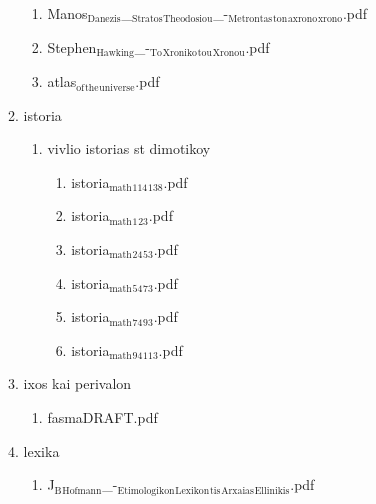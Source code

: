 \documentclass[11pt]{article}
\begin{document}
\begin{enumerate}
\begin{enumerate}
\begin{enumerate}
\item Manos$_{\text{Danezis}}$\_$_{\text{Stratos}}$$_{\text{Theodosiou}}$\_-$_{\text{Metrontas}}$$_{\text{ton}}$$_{\text{axrono}}$$_{\text{xrono}}$.pdf
\label{sec-1-1-1-1-49-2-2-1-67-2}

\item Stephen$_{\text{Hawking}}$\_-$_{\text{To}}$$_{\text{Xroniko}}$$_{\text{tou}}$$_{\text{Xronou}}$.pdf
\label{sec-1-1-1-1-49-2-2-1-67-3}

\item atlas$_{\text{of}}$$_{\text{the}}$$_{\text{universe}}$.pdf
\label{sec-1-1-1-1-49-2-2-1-67-4}
\end{enumerate}

\item istoria
\label{sec-1-1-1-1-49-2-2-1-68}
\begin{enumerate}
\item vivlio istorias st dimotikoy
\label{sec-1-1-1-1-49-2-2-1-68-1}
\begin{enumerate}
\item istoria$_{\text{math}}$$_{\text{114}}$$_{\text{138}}$.pdf
\label{sec-1-1-1-1-49-2-2-1-68-1-1}

\item istoria$_{\text{math}}$$_{\text{1}}$$_{\text{23}}$.pdf
\label{sec-1-1-1-1-49-2-2-1-68-1-2}

\item istoria$_{\text{math}}$$_{\text{24}}$$_{\text{53}}$.pdf
\label{sec-1-1-1-1-49-2-2-1-68-1-3}

\item istoria$_{\text{math}}$$_{\text{54}}$$_{\text{73}}$.pdf
\label{sec-1-1-1-1-49-2-2-1-68-1-4}

\item istoria$_{\text{math}}$$_{\text{74}}$$_{\text{93}}$.pdf
\label{sec-1-1-1-1-49-2-2-1-68-1-5}

\item istoria$_{\text{math}}$$_{\text{94}}$$_{\text{113}}$.pdf
\label{sec-1-1-1-1-49-2-2-1-68-1-6}
\end{enumerate}
\end{enumerate}

\item ixos kai perivalon
\label{sec-1-1-1-1-49-2-2-1-69}
\begin{enumerate}
\item fasmaDRAFT.pdf
\label{sec-1-1-1-1-49-2-2-1-69-1}
\end{enumerate}

\item lexika
\label{sec-1-1-1-1-49-2-2-1-70}
\begin{enumerate}
\item J$_{\text{B}}$$_{\text{Hofmann}}$\_-$_{\text{Etimologikon}}$$_{\text{Lexikon}}$$_{\text{tis}}$$_{\text{Arxaias}}$$_{\text{Ellinikis}}$.pdf
\label{sec-1-1-1-1-49-2-2-1-70-1}


\end{enumerate}
\end{enumerate}
\end{enumerate}
\end{document}
